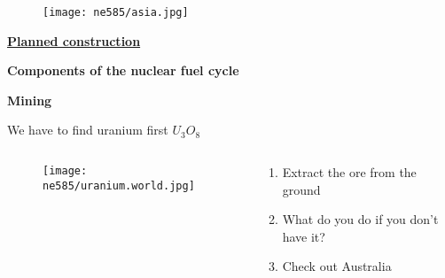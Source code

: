 \documentclass[aspectratio=1610,pdftex,dvipsnames,compress,xcolor={dvipsnames}]{beamer}
\begin{document}
\begin{frame}{}
    \begin{figure}
        \centering
        \texttt{[image: ne585/asia.jpg]}
    \end{figure}
\end{frame}


\begin{frame}[plain]{}
    \centering\LARGE\textbf{\href{https://www.world-nuclear.org/information-library/current-and-future-generation/plans-for-new-reactors-worldwide.aspx}{Planned construction}}
\end{frame}


\begin{frame}[plain]{}
    \centering\LARGE\textbf{Components of the nuclear fuel cycle}
\end{frame}


\begin{frame}[plain]{}
    \centering\LARGE\textbf{Mining}
\end{frame}


\addtocounter{framenumber}{-3} 
\begin{frame}{We have to find uranium first \href{https://www.uxc.com/p/prices/UxCPrices.aspx?currency=eur}{$U_3O_8$}}
    \begin{columns}[c]

        \begin{column}{0.55\textwidth}
            \begin{figure}
                \centering
                \texttt{[image: ne585/uranium.world.jpg]}
            \end{figure}
        \end{column}

        \begin{column}{0.45\textwidth}
            \begin{enumerate}[series=outerlist,topsep=0pt,itemsep=21pt,leftmargin=*,label=(\arabic*)]
                \item[]Extract the ore from the ground
                \item[]What do you do if you don't have it?
                \item[]Check out Australia
            \end{enumerate}
        \end{column}

    \end{columns}
\end{frame}
\end{document}

